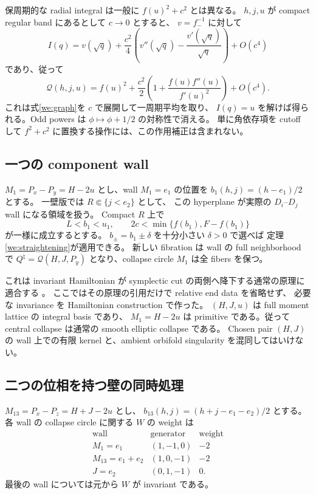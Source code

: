 \begin{remark}\label{we:action-correction}
保周期的な radial integral は一般に $f(u)^2+c^2$ とは異なる。
$h,j,u$ が compact regular band にあるとして $c\to0$ とすると、
$v=f_-^{-1}$ に対して
\[
 I(q)=v(\sqrt q)+\frac{c^2}{4}
 \left(v''(\sqrt q)-\frac{v'(\sqrt q)}{\sqrt q}\right)+O(c^4)
\]
であり、従って
\[
 \mathcal Q(h,j,u)
 =f(u)^2+\frac{c^2}{2}
 \left(1+\frac{f(u)f''(u)}{f'(u)^2}\right)+O(c^4).
\]
これは式\eqref{we:graph}を $c$ で展開して一周期平均を取り、
$I(q)=u$ を解けば得られる。Odd powers は $\phi\mapsto\phi+1/2$ の対称性で消える。
単に角依存項を cutoff して $f^2+c^2$ に置換する操作には、この作用補正は含まれない。
\end{remark}

\subsection{一つの component wall}

$M_1=P_x-P_y=H-2u$ とし、wall $M_1=e_1$ の位置を
$b_1(h,j)=(h-e_1)/2$ とする。
一壁版では $R\Subset\{j<e_2\}$ として、
この hyperplane が実際の $D_i$--$D_j$ wall になる領域を扱う。
Compact $R$ 上で
\begin{equation}\label{we:onewall-gap}
 L<b_1<u_1,\qquad 2c<\min\{f(b_1),F-f(b_1)\}
\end{equation}
が一様に成立するとする。
$b_\pm=b_1\pm\delta$ を十分小さい $\delta>0$ で選べば
定理\ref{we:straightening}が適用できる。
新しい fibration は wall の full neighborhood で
$Q^\natural=\mathcal Q(H,J,P_y)$ となり、collapse circle $M_1$ は全 fibers を保つ。

これは invariant Hamiltonian が symplectic cut の両側へ降下する通常の原理に適合する
\cite[\S1.1, Remarks 1.2 and 1.6]{lerman-cut-local}。
ここではその原理の引用だけで relative end data を省略せず、
必要な invariance を Hamiltonian construction で作った。
$(H,J,u)$ は full moment lattice の integral basis であり、
$M_1=H-2u$ は primitive である。従って central collapse は通常の smooth elliptic collapse である。
Chosen pair $(H,J)$ の wall 上での有限 kernel と、ambient orbifold singularity を混同してはいけない。

\subsection{二つの位相を持つ壁の同時処理}

$M_{13}=P_x-P_z=H+J-2u$ とし、
$b_{13}(h,j)=(h+j-e_1-e_2)/2$ とする。
各 wall の collapse circle に関する $W$ の weight は
\[
\begin{array}{c|c|c}
\text{wall}&\text{generator}&\text{weight}\\ \hline
M_1=e_1&(1,-1,0)&-2\\
M_{13}=e_1+e_2&(1,0,-1)&-2\\
J=e_2&(0,1,-1)&0 .
\end{array}
\]
最後の wall については元から $W$ が invariant である。

